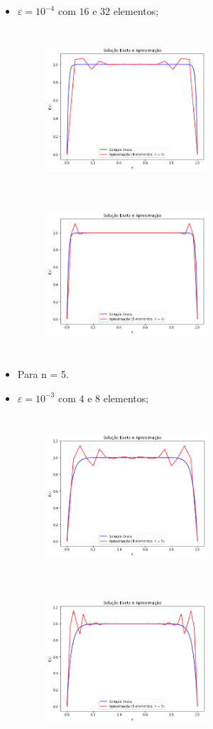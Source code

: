 \documentclass{article}
\begin{document}
\begin{itemize}
\begin{itemize}
\item $\varepsilon = 10^{-4}$ com $16$ e $32$ elementos;

\begin{figure}[!htb]
\centering
\includegraphics [width=6cm,height=6cm]{LetraC/4el_n4_e10-4.png}
\includegraphics [width=6cm,height=6cm]{LetraC/8el_n4_e10-4.png}
\end{figure}

\newpage
\item Para n = 5.
\item $\varepsilon = 10^{-3}$ com $4$ e $8$ elementos;

\begin{figure}[!htb]
\centering
\includegraphics [width=6cm,height=6cm]{LetraC/4el_n5_e10-3.png}
\includegraphics [width=6cm,height=6cm]{LetraC/8el_n5_e10-3.png}
\end{figure}


\end{itemize}
\end{itemize}
\end{document}
